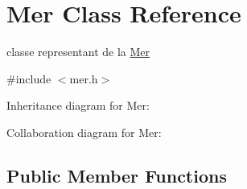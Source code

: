 \hypertarget{class_mer}{}\section{Mer Class Reference}
\label{class_mer}


classe representant de la \hyperlink{class_mer}{Mer}  




{\ttfamily \#include $<$mer.\+h$>$}



Inheritance diagram for Mer\+:


Collaboration diagram for Mer\+:
\subsection*{Public Member Functions}
